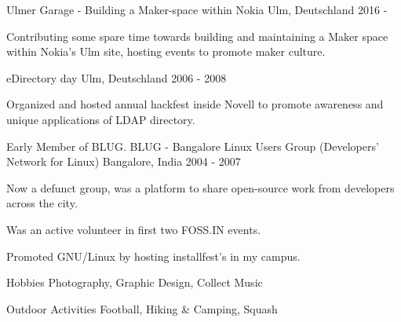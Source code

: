 

\begin{cventries}
	\cventry
    {} %
    {Ulmer Garage - Building a Maker-space within Nokia} %
    {Ulm, Deutschland} %
    {2016 - } %
    {
    	  \begin{cvitems}
    	    \item {Contributing some spare time towards building and maintaining a Maker space within Nokia's Ulm site, hosting events to promote maker culture.}
    	  \end{cvitems}
    }
	\cventry
    {} %
    {eDirectory day} %
    {Ulm, Deutschland} %
    {2006 - 2008} %
    {
    	  \begin{cvitems}
    	    \item {Organized and hosted annual hackfest inside Novell to promote awareness and unique applications of LDAP directory.}
    	  \end{cvitems}
    }
  \cventry
    {Early Member of BLUG.} %
    {BLUG - Bangalore Linux Users Group (Developers’ Network for Linux)} %
    {Bangalore, India} %
    {2004 - 2007} %
    {
      \begin{cvitems} %
       \item {Now a defunct group, was a platform to share open-source work from developers across the city.}
       \item {Was an active volunteer in first two FOSS.IN events.}
       \item {Promoted GNU/Linux by hosting installfest's in my campus.}
      \end{cvitems}
    }

\end{cventries}

\begin{cvskills}
\cvskill
	{Hobbies} %
	{Photography, Graphic Design, Collect Music} %

\cvskill
	{Outdoor Activities} %
	{Football, Hiking \& Camping, Squash} %
\end{cvskills}
